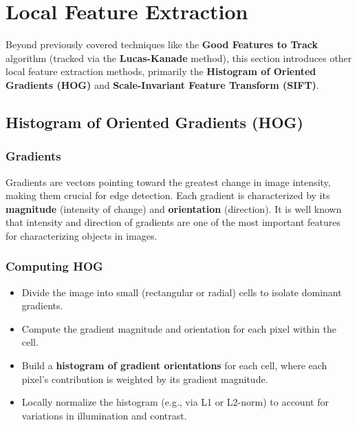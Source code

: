 \section{Local Feature Extraction}
Beyond previously covered techniques like the \textbf{Good Features to Track} algorithm (tracked via the \textbf{Lucas-Kanade} method), 
this section introduces other local feature extraction methods, primarily the \textbf{Histogram of Oriented Gradients (HOG)} and \textbf{Scale-Invariant Feature Transform (SIFT)}.

\subsection{Histogram of Oriented Gradients (HOG)}

\subsubsection{Gradients}
Gradients are vectors pointing toward the greatest change in image intensity, making them crucial for edge detection. 
Each gradient is characterized by its \textbf{magnitude} (intensity of change) and \textbf{orientation} (direction).
It is well known that intensity and direction of gradients are one of the most important features for characterizing objects in images.

\subsubsection{Computing HOG}
\begin{itemize}
    \item Divide the image into small (rectangular or radial) cells to isolate dominant gradients.
    \item Compute the gradient magnitude and orientation for each pixel within the cell.
    \item Build a \textbf{histogram of gradient orientations} for each cell, where each pixel's contribution is weighted by its gradient magnitude.
    \item Locally normalize the histogram (e.g., via L1 or L2-norm) to account for variations in illumination and contrast.
\end{itemize}

